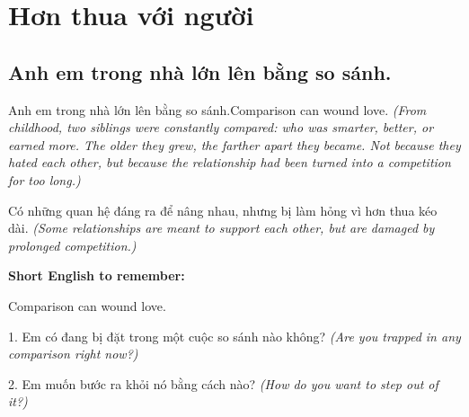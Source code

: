 \chapter{Hơn thua với người}

\section{Anh em trong nhà lớn lên bằng so sánh.}
\begin{truyen}{Anh em trong nhà lớn lên bằng so sánh.}{Comparison can wound love.}
\textit{(From childhood, two siblings were constantly compared: who was smarter, better, or earned more. The older they grew, the farther apart they became. Not because they hated each other, but because the relationship had been turned into a competition for too long.)}
\end{truyen}
\begin{baihoc}
Có những quan hệ đáng ra để nâng nhau, nhưng bị làm hỏng vì hơn thua kéo dài.
\textit{(Some relationships are meant to support each other, but are damaged by prolonged competition.)}
\end{baihoc}
\begin{ghinhoanh}\textbf{Short English to remember:}

Comparison can wound love.
\end{ghinhoanh}
\begin{tuhocnhanh}
1. Em có đang bị đặt trong một cuộc so sánh nào không? \textit{(Are you trapped in any comparison right now?)}

2. Em muốn bước ra khỏi nó bằng cách nào? \textit{(How do you want to step out of it?)}
\end{tuhocnhanh}
\ngancach

